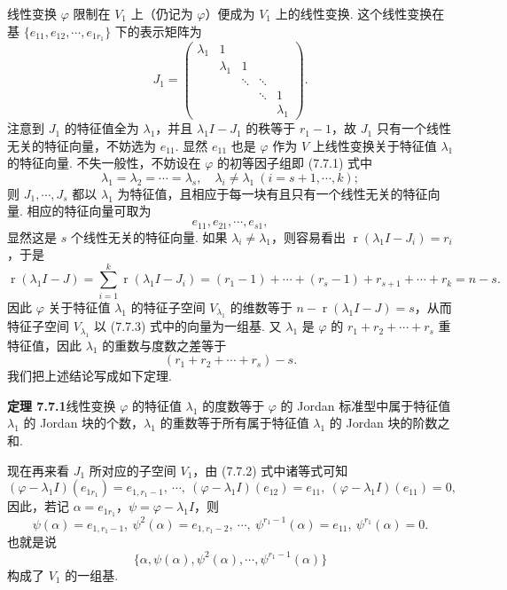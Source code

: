 \documentclass[UTF8, 12pt, fontset=fandol, oneside]{ctexart}
\begin{document}
线性变换 $\varphi$ 限制在 $V_1$ 上（仍记为 $\varphi$）便成为 $V_1$ 上的线性变换. 这个线性变换在基 $\{e_{11},e_{12},\cdots,e_{1r_1}\}$ 下的表示矩阵为
\[
J_1=\left(\begin{array}{ccccc}
\lambda_1 & 1 & & & \\
& \lambda_1 & 1 & & \\
& & \ddots & \ddots & \\
& & & \ddots & 1\\
& & & & \lambda_1
\end{array}\right).
\]
注意到 $J_1$ 的特征值全为 $\lambda_1$，并且 $\lambda_1I-J_1$ 的秩等于 $r_1-1$，故 $J_1$ 只有一个线性无关的特征向量，不妨选为 $e_{11}$. 显然 $e_{11}$ 也是 $\varphi$ 作为 $V$ 上线性变换关于特征值 $\lambda_1$ 的特征向量. 不失一般性，不妨设在 $\varphi$ 的初等因子组即 (7.7.1) 式中
\[
\lambda_1=\lambda_2=\cdots=\lambda_s,\quad \lambda_i\ne\lambda_1\ (i=s+1,\cdots,k);
\]
则 $J_1,\cdots,J_s$ 都以 $\lambda_1$ 为特征值，且相应于每一块有且只有一个线性无关的特征向量. 相应的特征向量可取为
\begin{equation}
e_{11},e_{21},\cdots,e_{s1},
\tag{7.7.3}
\end{equation}
显然这是 $s$ 个线性无关的特征向量. 如果 $\lambda_i\ne\lambda_1$，则容易看出 $\operatorname{r}(\lambda_1I-J_i)=r_i$，于是
\[
\operatorname{r}(\lambda_1I-J)=\sum_{i=1}^k\operatorname{r}(\lambda_1I-J_i)=(r_1-1)+\cdots+(r_s-1)+r_{s+1}+\cdots+r_k=n-s.
\]
因此 $\varphi$ 关于特征值 $\lambda_1$ 的特征子空间 $V_{\lambda_1}$ 的维数等于 $n-\operatorname{r}(\lambda_1I-J)=s$，从而特征子空间 $V_{\lambda_1}$ 以 (7.7.3) 式中的向量为一组基. 又 $\lambda_1$ 是 $\varphi$ 的 $r_1+r_2+\cdots+r_s$ 重特征值，因此 $\lambda_1$ 的重数与度数之差等于
\[
(r_1+r_2+\cdots+r_s)-s.
\]
我们把上述结论写成如下定理.

\noindent\textbf{定理 7.7.1}\quad 线性变换 $\varphi$ 的特征值 $\lambda_1$ 的度数等于 $\varphi$ 的 Jordan 标准型中属于特征值 $\lambda_1$ 的 Jordan 块的个数，$\lambda_1$ 的重数等于所有属于特征值 $\lambda_1$ 的 Jordan 块的阶数之和.

现在再来看 $J_1$ 所对应的子空间 $V_1$，由 (7.7.2) 式中诸等式可知
\[
(\varphi-\lambda_1I)(e_{1r_1})=e_{1,r_1-1},\ \cdots,\ (\varphi-\lambda_1I)(e_{12})=e_{11},\ (\varphi-\lambda_1I)(e_{11})=0,
\]
因此，若记 $\alpha=e_{1r_1}$，$\psi=\varphi-\lambda_1I$，则
\[
\psi(\alpha)=e_{1,r_1-1},\ \psi^2(\alpha)=e_{1,r_1-2},\ \cdots,\ \psi^{r_1-1}(\alpha)=e_{11},\ \psi^{r_1}(\alpha)=0.
\]
也就是说
\[
\{\alpha,\psi(\alpha),\psi^2(\alpha),\cdots,\psi^{r_1-1}(\alpha)\}
\]
构成了 $V_1$ 的一组基.
\end{document}
